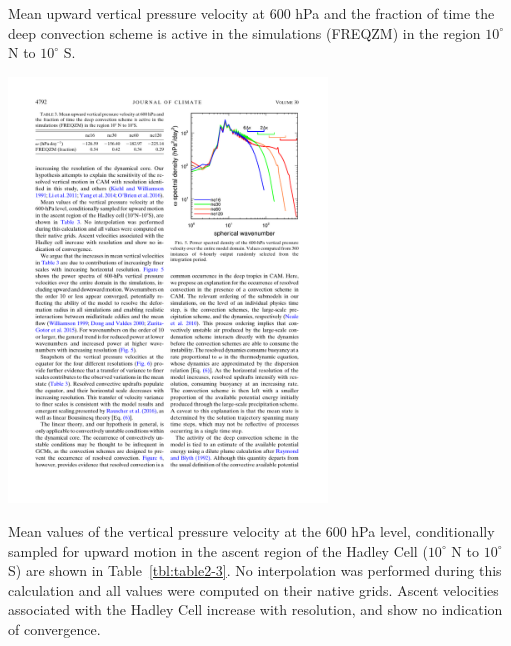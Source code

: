 \begin{table}[t]
\caption{Mean upward vertical pressure velocity at 600 hPa and the fraction of time the deep convection scheme is active in the simulations (FREQZM) in the region $10^{\circ}$ N to $10^{\circ}$ S.}
\begin{center}
\noindent\includegraphics[width=20pc,angle=0]{chapter2/table3.pdf}\\
\end{center}
\label{tbl:table2-3}
\end{table}

Mean values of the vertical pressure velocity at the 600 hPa level, conditionally sampled for upward motion in the ascent region of the Hadley Cell ($10^{\circ}$ N to $10^{\circ}$ S) are shown in Table~\ref{tbl:table2-3}. No interpolation was performed during this calculation and all values were computed on their native grids. Ascent velocities associated with the Hadley Cell increase with resolution, and show no indication of convergence. 

